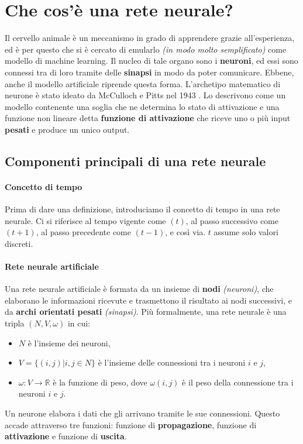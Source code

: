 \documentclass[12pt, twoside, letterpaper]{report}
\begin{document}
		\section{Che cos'è una rete neurale?}
			Il cervello animale è un meccanismo in grado di apprendere grazie all'esperienza, ed è per questo che si è cercato di emularlo \textit{(in modo molto semplificato)} come modello di machine learning. Il nucleo di tale organo sono i \textbf{neuroni}, ed essi sono connessi tra di loro tramite delle \textbf{sinapsi} in modo da poter comunicare. Ebbene, anche il modello artificiale riprende questa forma. L'archetipo matematico di neurone è stato ideato da McCulloch e Pitts nel 1943 \cite{mcculloch_pitts}. Lo descrivono come un modello contenente una soglia che ne determina lo stato di attivazione e una funzione non lineare detta \textbf{funzione di attivazione} che riceve uno o più input \textbf{pesati} e produce un unico output.
			
		\subsection{Componenti principali di una rete neurale} 
			\paragraph{Concetto di tempo} Prima di dare una definizione, introduciamo il concetto di tempo in una rete neurale. Ci si riferisce al tempo vigente come $(t)$, al passo successivo come $(t+1)$, al passo precedente come $(t-1)$, e così via. $t$ assume solo valori discreti.
			
			\paragraph{Rete neurale artificiale} Una rete neurale artificiale è formata da un insieme di \textbf{nodi} \textit{(neuroni)}, che elaborano le informazioni ricevute e trasmettono il risultato ai nodi successivi, e da \textbf{archi orientati pesati} \textit{(sinapsi)}. Più formalmente, una rete neurale è una tripla $(N,V, \omega)$ in cui:
			\begin{itemize}
				\item $N$ è l'insieme dei neuroni,
				\item $V = \{(i,j) | i,j \in N\}$ è l'insieme delle connessioni tra i neuroni $i$ e $j$, 
				\item $\omega: V \rightarrow \mathbb{R}$ è la funzione di peso, dove $\omega(i,j)$ è il peso della connessione tra i neuroni $i$ e $j$.  
			\end{itemize}
			Un neurone elabora i dati che gli arrivano tramite le sue connessioni. Questo accade attraverso tre funzioni: funzione di \textbf{propagazione}, funzione di \textbf{attivazione} e funzione di \textbf{uscita}.
			
\end{document}
